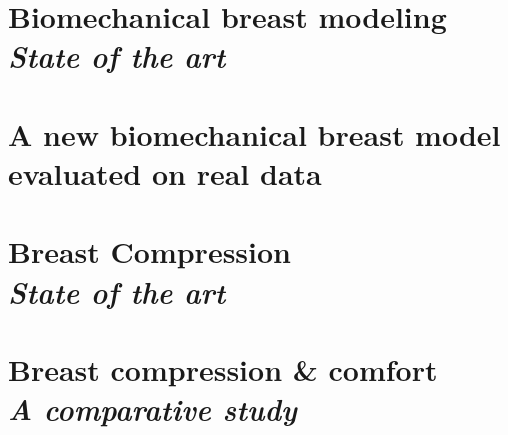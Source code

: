 \documentclass[a4paper,12pt,twoside]{report}
\begin{document}
\chapter{Biomechanical breast modeling\\ \textit{State of the art}}\label{chapter:bioMecaModelsBackground}



\chapter{A new biomechanical breast model evaluated on real data}\label{chapter:myBioMecaModel}




\clearemptydoublepage
\chapter{Breast Compression\\ \textit{State of the art} }\label{chapter:compression:introduction}


\chapter{Breast compression \& comfort \\ \textit{A comparative study}}\label{chapter:compressionfem}


\clearemptydoublepage



%

%
\end{document}
